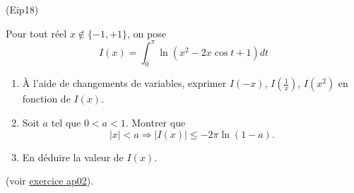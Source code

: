 \begin{tiny}(Eip18)\end{tiny}
Pour tout réel $x\notin\{-1,+1\}$, on pose
\begin{displaymath}
I(x) = \int_{0}^{\pi }\ln (x^{2}-2x\cos t+1)dt 
\end{displaymath}
\begin{enumerate}
 \item \`A l'aide de changements de variables, exprimer $I(-x)$, $I(\frac{1}{x})$, $I(x^2)$ en fonction de $I(x)$.
\item Soit $a$ tel que $0<a<1$. Montrer que
\begin{displaymath}
 |x|<a\Rightarrow |I(x)|\leq -2\pi \ln(1-a).
\end{displaymath}
\item En déduire la valeur de $I(x)$.
\end{enumerate}
 (voir \href{\baseurl temptex/fexap.pdf}{exercice ap02}).
